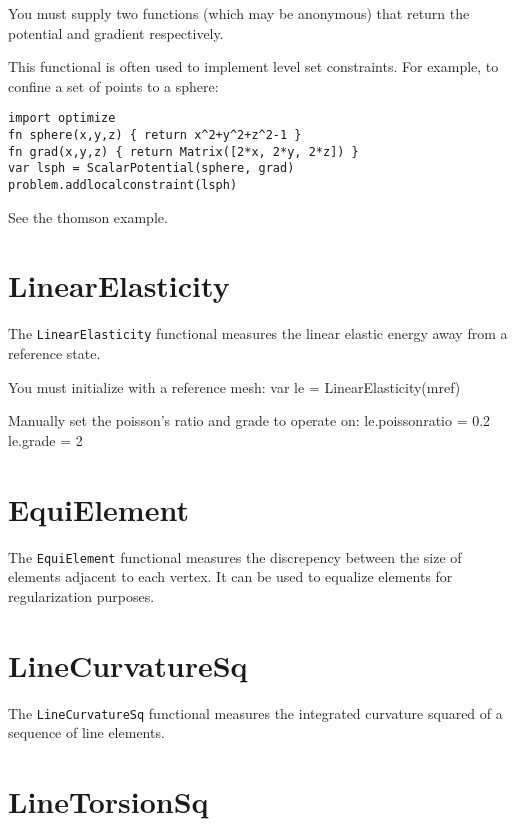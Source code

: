 You must supply two functions (which may be anonymous) that return the
potential and gradient respectively.

This functional is often used to implement level set constraints. For
example, to confine a set of points to a sphere:

\begin{lstlisting}
import optimize
fn sphere(x,y,z) { return x^2+y^2+z^2-1 }
fn grad(x,y,z) { return Matrix([2*x, 2*y, 2*z]) }
var lsph = ScalarPotential(sphere, grad)
problem.addlocalconstraint(lsph)
\end{lstlisting}

See the thomson example.

\hypertarget{linearelasticity}{%
\section{LinearElasticity}\label{linearelasticity}}

The \texttt{LinearElasticity} functional measures the linear elastic
energy away from a reference state.

You must initialize with a reference mesh: var le =
LinearElasticity(mref)

Manually set the poisson's ratio and grade to operate on:
le.poissonratio = 0.2 le.grade = 2

\hypertarget{equielement}{%
\section{EquiElement}\label{equielement}}

The \texttt{EquiElement} functional measures the discrepency between the
size of elements adjacent to each vertex. It can be used to equalize
elements for regularization purposes.

\hypertarget{linecurvaturesq}{%
\section{LineCurvatureSq}\label{linecurvaturesq}}

The \texttt{LineCurvatureSq} functional measures the integrated
curvature squared of a sequence of line elements.

\hypertarget{linetorsionsq}{%
\section{LineTorsionSq}\label{linetorsionsq}}

